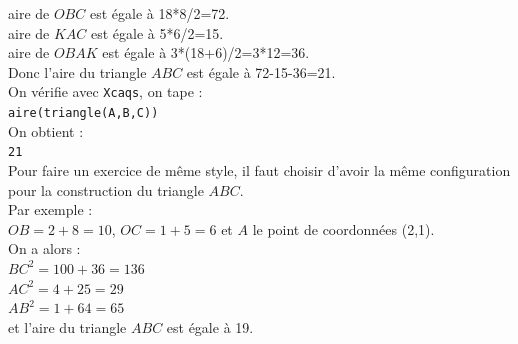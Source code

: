 \documentclass[a4paper,11pt]{book}
\begin{document}
aire de $OBC$ est \'egale \`a 18*8/2=72.\\
aire de $KAC$ est \'egale \`a 5*6/2=15.\\
aire de $OBAK$ est \'egale \`a 3*(18+6)/2=3*12=36.\\
Donc l'aire du triangle $ABC$ est \'egale \`a 72-15-36=21.\\
On  v\'erifie avec {\tt Xcaqs}, on tape :\\
{\tt aire(triangle(A,B,C))}\\
On obtient :\\
{\tt 21}\\
Pour faire un exercice de m\^eme style, il faut choisir d'avoir
la m\^eme configuration pour la construction du triangle $ABC$.\\
Par exemple :\\
$OB=2+8=10$, $OC=1+5=6$ et $A$ le point de coordonn\'ees (2,1).\\
On a alors :\\
$BC^2=100+36=136$\\
$AC^2=4+25=29$\\
$AB^2=1+64=65$\\
et  l'aire du triangle $ABC$ est \'egale \`a 19.
\end{document}
